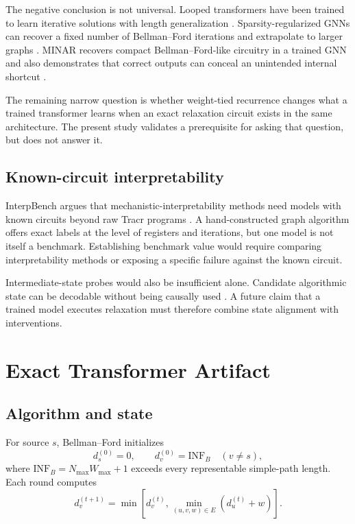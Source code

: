 \documentclass[10pt,twocolumn]{article}
\newcommand{\infb}{\mathrm{INF}_{B}}
\begin{document}
The negative conclusion is not universal. Looped transformers have been
trained to learn iterative solutions with length generalization
\citep{fan2024looped}. Sparsity-regularized GNNs can recover a fixed number of
Bellman--Ford iterations and extrapolate to larger graphs
\citep{nerem2026gnn}. MINAR recovers compact Bellman--Ford-like circuitry in a
trained GNN and also demonstrates that correct outputs can conceal an
unintended internal shortcut \citep{he2026minar}.

The remaining narrow question is whether weight-tied recurrence changes what a
trained transformer learns when an exact relaxation circuit exists in the
same architecture. The present study validates a prerequisite for asking that
question, but does not answer it.

\subsection{Known-circuit interpretability}

InterpBench argues that mechanistic-interpretability methods need models with
known circuits beyond raw Tracr programs \citep{gupta2024interpbench}. A
hand-constructed graph algorithm offers exact labels at the level of registers
and iterations, but one model is not itself a benchmark. Establishing
benchmark value would require comparing interpretability methods or exposing
a specific failure against the known circuit.

Intermediate-state probes would also be insufficient alone. Candidate
algorithmic state can be decodable without being causally used
\citep{darade2026represented}. A future claim that a trained model executes
relaxation must therefore combine state alignment with interventions.

\section{Exact Transformer Artifact}

\subsection{Algorithm and state}

For source \(s\), Bellman--Ford initializes
\begin{equation}
  d_s^{(0)}=0,\qquad d_v^{(0)}=\infb\quad(v\ne s),
\end{equation}
where \(\infb=N_{\max}W_{\max}+1\) exceeds every representable simple-path
length. Each round computes
\begin{equation}
  d_v^{(t+1)}
  =
  \min\!\left[
    d_v^{(t)},
    \min_{(u,v,w)\in E}\left(d_u^{(t)}+w\right)
  \right].
  \label{eq:bf}
\end{equation}
\end{document}
